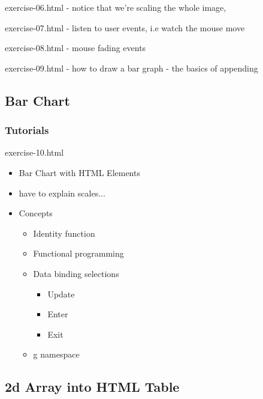 \documentclass{beamer}
\begin{document}
exercise-06.html
- notice that we're scaling the whole image, 

exercise-07.html
- listen to user events, i.e watch the mouse move

exercise-08.html
- mouse fading events

exercise-09.html
- how to draw a bar graph
- the basics of appending 

\subsection{Bar Chart}

\begin{frame}
    \frametitle{Tutorials}
    \begin{block}{exercise-10.html}
        \begin{itemize}
            \pause
            \item Bar Chart with HTML Elements
            \pause
            \item have to explain scales... 

            \item Concepts
            \begin{itemize}
                \pause
                \item Identity function
                \pause
                \item Functional programming
                \pause
                \item Data binding selections
                \begin{itemize}
                    \pause
                    \item Update
                    \pause
                    \item Enter
                    \pause
                    \item Exit
                \end{itemize}
                \pause
                \item g namespace
            \end{itemize}
        \end{itemize}
    \end{block}
\end{frame}


\subsection{2d Array into HTML Table}
\end{document}
